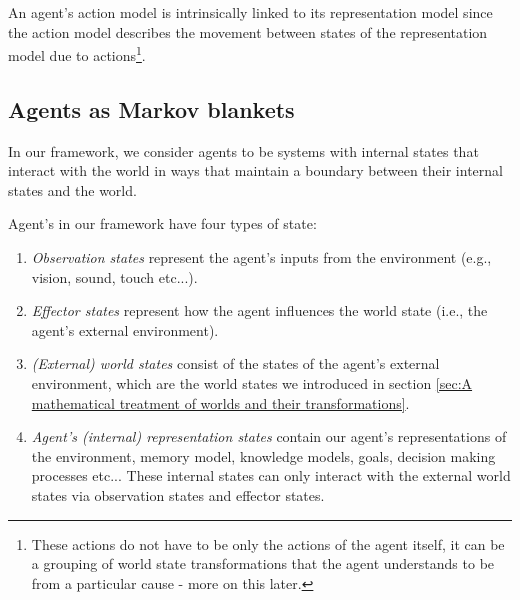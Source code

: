 An agent's action model is intrinsically linked to its representation model since the action model describes the movement between states of the representation model due to actions\footnote{These actions do not have to be only the actions of the agent itself, it can be a grouping of world state transformations that the agent understands to be from a particular cause - more on this later.}.



\subsection{Agents as Markov blankets}

In our framework, we consider agents to be systems with internal states that interact with the world in ways that maintain a boundary between their internal states and the world.

Agent's in our framework have four types of state:
\begin{enumerate}
    \item \emph{Observation states} represent the agent's inputs from the environment (e.g., vision, sound, touch etc...).
    \item \emph{Effector states} represent how the agent influences the world state (i.e., the agent's external environment).
    \item \emph{(External) world states} consist of the states of the agent's external environment, which are the world states we introduced in section \ref{sec:A mathematical treatment of worlds and their transformations}.
    \item \emph{Agent's (internal) representation states} contain our agent's representations of the environment, memory model, knowledge models, goals, decision making processes etc...
          These internal states can only interact with the external world states via observation states and effector states.
\end{enumerate}

